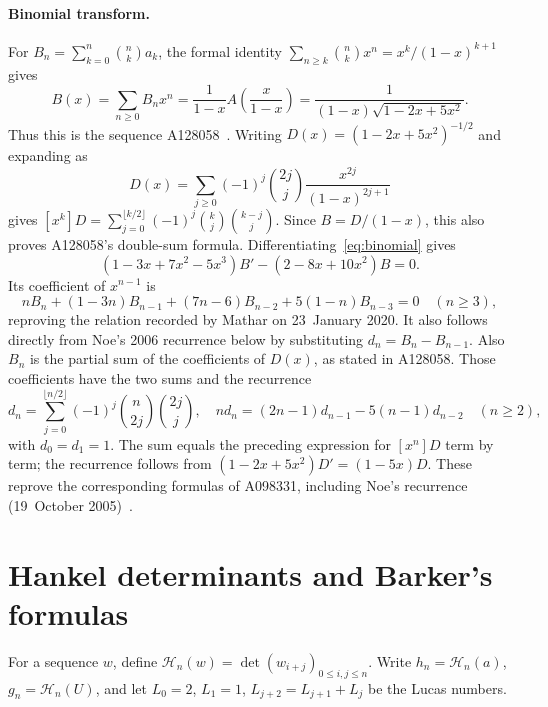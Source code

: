 \documentclass[11pt]{article}
\begin{document}
\paragraph{Binomial transform.}
For $B_n=\sum_{k=0}^n\binom nk a_k$, the formal identity
$\sum_{n\geq k}\binom nk x^n=x^k/(1-x)^{k+1}$ gives
\begin{equation}\label{eq:binomial}
 B(x)=\sum_{n\geq0}B_nx^n
 =\frac1{1-x}A\!\left(\frac{x}{1-x}\right)
 =\frac1{(1-x)\sqrt{1-2x+5x^2}}.
\end{equation}
Thus this is the sequence A128058~\cite{a128058}.
Writing $D(x)=(1-2x+5x^2)^{-1/2}$ and expanding as
\[
 D(x)=\sum_{j\geq0}(-1)^j\binom{2j}{j}
             \frac{x^{2j}}{(1-x)^{2j+1}}
\]
gives $[x^k]D=\sum_{j=0}^{\lfloor k/2\rfloor}
(-1)^j\binom{k}{j}\binom{k-j}{j}$.
Since $B=D/(1-x)$, this also proves A128058's double-sum formula.
Differentiating~\eqref{eq:binomial} gives
\[
 (1-3x+7x^2-5x^3)B'-(2-8x+10x^2)B=0.
\]
Its coefficient of $x^{n-1}$ is
\begin{equation}\label{eq:binrec}
 nB_n+(1-3n)B_{n-1}+(7n-6)B_{n-2}+5(1-n)B_{n-3}=0
 \quad(n\geq3),
\end{equation}
reproving the relation recorded by Mathar on 23~January 2020.
It also follows directly from Noe's 2006 recurrence below by substituting
$d_n=B_n-B_{n-1}$.
Also $B_n$ is the partial sum of the coefficients of $D(x)$, as stated
in A128058. Those coefficients have the two sums and the recurrence
\[
 d_n=\sum_{j=0}^{\lfloor n/2\rfloor}(-1)^j\binom n{2j}\binom{2j}j,
 \quad
 nd_n=(2n-1)d_{n-1}-5(n-1)d_{n-2}\quad(n\geq2),
\]
with $d_0=d_1=1$. The sum equals the preceding expression for $[x^n]D$
term by term; the recurrence follows from
$(1-2x+5x^2)D'=(1-5x)D$. These reprove the corresponding formulas of
A098331, including Noe's recurrence (19~October 2005)~\cite{a098331}.

\section{Hankel determinants and Barker's formulas}
For a sequence $w$, define
$\mathcal H_n(w)=\det(w_{i+j})_{0\leq i,j\leq n}$.
Write $h_n=\mathcal H_n(a)$, $g_n=\mathcal H_n(U)$, and let
$L_0=2$, $L_1=1$, $L_{j+2}=L_{j+1}+L_j$ be the Lucas numbers.
\end{document}
